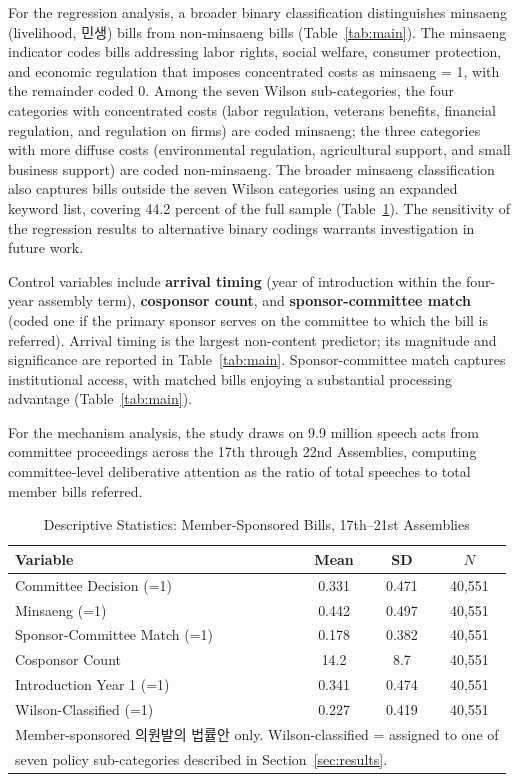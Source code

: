\documentclass[11pt]{article}
\begin{document}
For the regression analysis, a broader binary classification distinguishes minsaeng (livelihood, 민생) bills from non-minsaeng bills (Table~\ref{tab:main}). The minsaeng indicator codes bills addressing labor rights, social welfare, consumer protection, and economic regulation that imposes concentrated costs as minsaeng = 1, with the remainder coded 0. Among the seven Wilson sub-categories, the four categories with concentrated costs (labor regulation, veterans benefits, financial regulation, and regulation on firms) are coded minsaeng; the three categories with more diffuse costs (environmental regulation, agricultural support, and small business support) are coded non-minsaeng. The broader minsaeng classification also captures bills outside the seven Wilson categories using an expanded keyword list, covering 44.2 percent of the full sample (Table~\ref{tab:desc}). The sensitivity of the regression results to alternative binary codings warrants investigation in future work.

Control variables include \textbf{arrival timing} (year of introduction within the four-year assembly term), \textbf{cosponsor count}, and \textbf{sponsor-committee match} (coded one if the primary sponsor serves on the committee to which the bill is referred). Arrival timing is the largest non-content predictor; its magnitude and significance are reported in Table~\ref{tab:main}. Sponsor-committee match captures institutional access, with matched bills enjoying a substantial processing advantage (Table~\ref{tab:main}).

For the mechanism analysis, the study draws on 9.9 million speech acts from committee proceedings across the 17th through 22nd Assemblies, computing committee-level deliberative attention as the ratio of total speeches to total member bills referred.

\begin{table}[htbp]
\centering
\caption{Descriptive Statistics: Member-Sponsored Bills, 17th--21st Assemblies}
\label{tab:desc}
\begin{tabular}{lccc}
\toprule
Variable & Mean & SD & $N$ \\
\midrule
Committee Decision (=1) & 0.331 & 0.471 & 40,551 \\
Minsaeng (=1) & 0.442 & 0.497 & 40,551 \\
Sponsor-Committee Match (=1) & 0.178 & 0.382 & 40,551 \\
Cosponsor Count & 14.2 & 8.7 & 40,551 \\
Introduction Year 1 (=1) & 0.341 & 0.474 & 40,551 \\
Wilson-Classified (=1) & 0.227 & 0.419 & 40,551 \\
\bottomrule
\multicolumn{4}{l}{\footnotesize Member-sponsored 의원발의 법률안 only. Wilson-classified = assigned to one of} \\
\multicolumn{4}{l}{\footnotesize seven policy sub-categories described in Section~\ref{sec:results}.} \\
\end{tabular}
\end{table}
\end{document}
